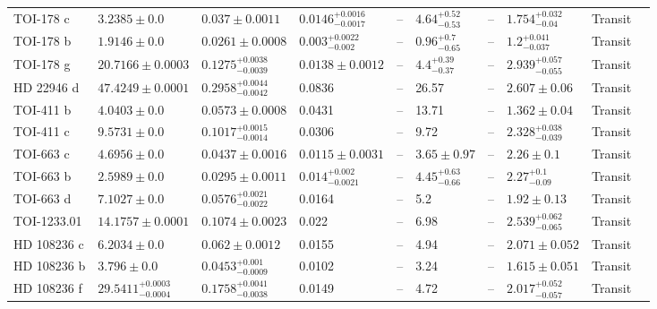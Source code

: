 \begin{tabular}{llllllllll}
TOI-178 c & $3.2385 \pm 0.0$ & $0.037 \pm 0.0011$ & $0.0146^{+0.0016}_{-0.0017}$ & -- & $4.64^{+0.52}_{-0.53}$ & -- & $1.754^{+0.032}_{-0.04}$ & Transit & \cite{LELEU_ET_AL__2024} \\
TOI-178 b & $1.9146 \pm 0.0$ & $0.0261 \pm 0.0008$ & $0.003^{+0.0022}_{-0.002}$ & -- & $0.96^{+0.7}_{-0.65}$ & -- & $1.2^{+0.041}_{-0.037}$ & Transit & \cite{LELEU_ET_AL__2024} \\
TOI-178 g & $20.7166 \pm 0.0003$ & $0.1275^{+0.0038}_{-0.0039}$ & $0.0138 \pm 0.0012$ & -- & $4.4^{+0.39}_{-0.37}$ & -- & $2.939^{+0.057}_{-0.055}$ & Transit & \cite{LELEU_ET_AL__2024} \\
HD 22946 d & $47.4249 \pm 0.0001$ & $0.2958^{+0.0044}_{-0.0042}$ & 0.0836 & -- & 26.57 & -- & $2.607 \pm 0.06$ & Transit & \cite{GARAI_ET_AL__2023} \\
TOI-411 b & $4.0403 \pm 0.0$ & $0.0573 \pm 0.0008$ & 0.0431 & -- & 13.71 & -- & $1.362 \pm 0.04$ & Transit & \cite{GARAI_ET_AL__2023} \\
TOI-411 c & $9.5731 \pm 0.0$ & $0.1017^{+0.0015}_{-0.0014}$ & 0.0306 & -- & 9.72 & -- & $2.328^{+0.038}_{-0.039}$ & Transit & \cite{GARAI_ET_AL__2023} \\
TOI-663 c & $4.6956 \pm 0.0$ & $0.0437 \pm 0.0016$ & $0.0115 \pm 0.0031$ & -- & $3.65 \pm 0.97$ & -- & $2.26 \pm 0.1$ & Transit & \cite{COINTEPAS_ET_AL__2024} \\
TOI-663 b & $2.5989 \pm 0.0$ & $0.0295 \pm 0.0011$ & $0.014^{+0.002}_{-0.0021}$ & -- & $4.45^{+0.63}_{-0.66}$ & -- & $2.27^{+0.1}_{-0.09}$ & Transit & \cite{COINTEPAS_ET_AL__2024} \\
TOI-663 d & $7.1027 \pm 0.0$ & $0.0576^{+0.0021}_{-0.0022}$ & 0.0164 & -- & 5.2 & -- & $1.92 \pm 0.13$ & Transit & \cite{COINTEPAS_ET_AL__2024} \\
TOI-1233.01 & $14.1757 \pm 0.0001$ & $0.1074 \pm 0.0023$ & 0.022 & -- & 6.98 & -- & $2.539^{+0.062}_{-0.065}$ & Transit & \cite{BONFANTI_ET_AL__2021} \\
HD 108236 c & $6.2034 \pm 0.0$ & $0.062 \pm 0.0012$ & 0.0155 & -- & 4.94 & -- & $2.071 \pm 0.052$ & Transit & \cite{BONFANTI_ET_AL__2021} \\
HD 108236 b & $3.796 \pm 0.0$ & $0.0453^{+0.001}_{-0.0009}$ & 0.0102 & -- & 3.24 & -- & $1.615 \pm 0.051$ & Transit & \cite{BONFANTI_ET_AL__2021} \\
HD 108236 f & $29.5411^{+0.0003}_{-0.0004}$ & $0.1758^{+0.0041}_{-0.0038}$ & 0.0149 & -- & 4.72 & -- & $2.017^{+0.052}_{-0.057}$ & Transit & \cite{BONFANTI_ET_AL__2021} \\

\end{tabular}
